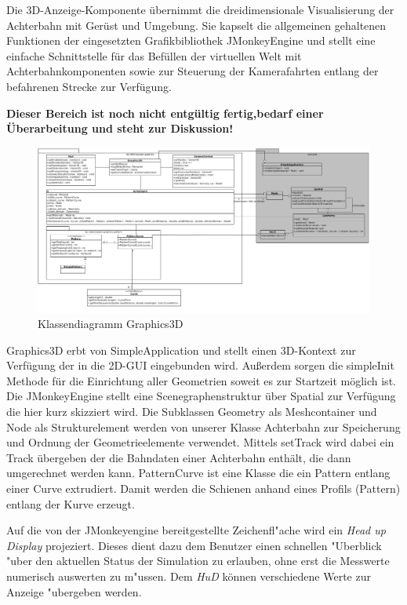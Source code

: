 Die  3D-Anzeige-Komponente übernimmt die dreidimensionale Visualisierung der Achterbahn
mit Gerüst und Umgebung. Sie kapselt die allgemeinen gehaltenen Funktionen der eingesetzten
Grafikbibliothek JMonkeyEngine und stellt eine einfache Schnittstelle für das Befüllen 
der virtuellen Welt mit Achterbahnkomponenten sowie zur Steuerung der Kamerafahrten 
entlang der befahrenen Strecke zur Verfügung.

\textbf {Dieser Bereich ist noch nicht entgültig fertig,bedarf einer Überarbeitung und steht zur Diskussion!}

\begin{figure}
\includegraphics[width=\linewidth]{bilder/klassendiagramm_006}
\caption{Klassendiagramm Graphics3D}
\end{figure}

Graphics3D erbt von SimpleApplication und stellt einen 3D-Kontext zur Verfügung der in die 2D-GUI eingebunden wird. Außerdem sorgen die simpleInit Methode für die Einrichtung aller Geometrien soweit es zur Startzeit möglich ist.
Die JMonkeyEngine stellt eine Scenegraphenstruktur über Spatial zur Verfügung die hier kurz skizziert wird. Die Subklassen Geometry als Meshcontainer und Node als Strukturelement werden von unserer Klasse Achterbahn 
zur Speicherung und Ordnung der Geometrieelemente verwendet. Mittels setTrack wird dabei ein Track übergeben der die Bahndaten einer Achterbahn enthält, die dann umgerechnet werden kann. PatternCurve ist eine Klasse die ein Pattern entlang einer Curve extrudiert. 
Damit werden die Schienen anhand eines Profils (Pattern) entlang der Kurve erzeugt. 

Auf die von der JMonkeyengine bereitgestellte Zeichenfl"ache wird ein \textsl{Head up Display} projeziert. Dieses dient dazu dem Benutzer einen schnellen 
"Uberblick "uber den  aktuellen Status der Simulation zu erlauben, ohne erst die Messwerte numerisch auswerten zu m"ussen. Dem \textsl{HuD} können verschiedene Werte zur
Anzeige "ubergeben werden.

